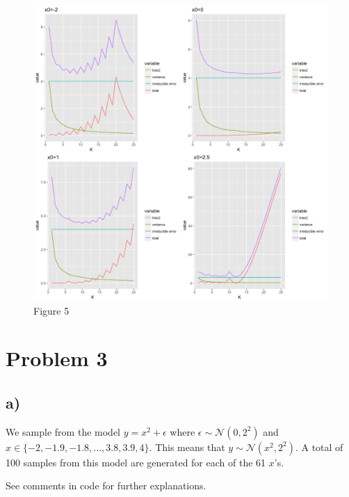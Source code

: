 \documentclass[]{article}
\begin{document}
\begin{figure}
\centering
\includegraphics{Prob1f5.png}
\caption{Figure 5}
\end{figure}

\section{Problem 3}\label{problem-3}

\subsection{a)}\label{a}

We sample from the model \(y=x^2+\epsilon\) where
\(\epsilon \sim \mathcal{N}(0,2^2)\) and
\(x\in \{-2,-1.9,-1.8,...,3.8,3.9,4\}\). This means that
\(y \sim \mathcal{N}(x^2,2^2)\). A total of 100 samples from this model
are generated for each of the 61 \(x\)'s.

See comments in code for further explanations.
\end{document}
